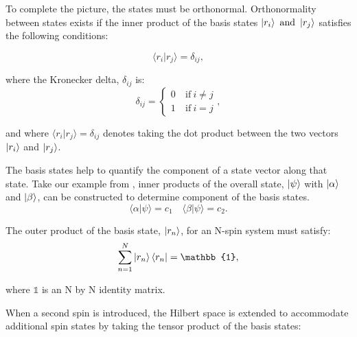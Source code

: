 To complete the picture, the states must be orthonormal. Orthonormality between states exists if the inner product
of the basis states $\ket{r_i} ~\text{and}~ \ket{r_j}$ satisfies the following conditions:

\begin{equation}
  \langle r_i\vert r_j\rangle = \delta_{ij},
\end{equation}

where the Kronecker delta, $\delta_{ij}$ is:
\begin{equation}
  \delta_{ij} = \begin{cases}
    0 & ~\text{if}~ i \ne j\\
    1 & ~\text{if}~ i = j
                \end{cases},
\end{equation}

and where $\langle r_i\vert r_j\rangle = \delta_{ij}$ denotes taking the dot product between the two
vectors $\ket{r_i}$ and $\ket{r_j}$.

The basis states help to quantify the component of a state vector along that state. Take our example
from , inner products of the overall state, $\ket{\psi}$ with $\ket{\alpha}$
and $\ket{\beta}$, can be constructed to determine component of the basis states.
\begin{equation}
  \langle\alpha\vert\psi\rangle = c_1 \quad \langle\beta\vert\psi\rangle = c_2.
\end{equation}

The outer product of the basis state, $\ket{r_n}$, for an N-spin system must satisfy:
\begin{equation}
  \sum_{n=1}^{N} \ket{r_n}\bra{r_n} = \mathbb{1},
\end{equation}

where $\mathbb{1}$ is an N by N identity matrix.

When a second spin is introduced, the Hilbert space is extended to accommodate additional spin
states by taking the tensor product of the basis states:


